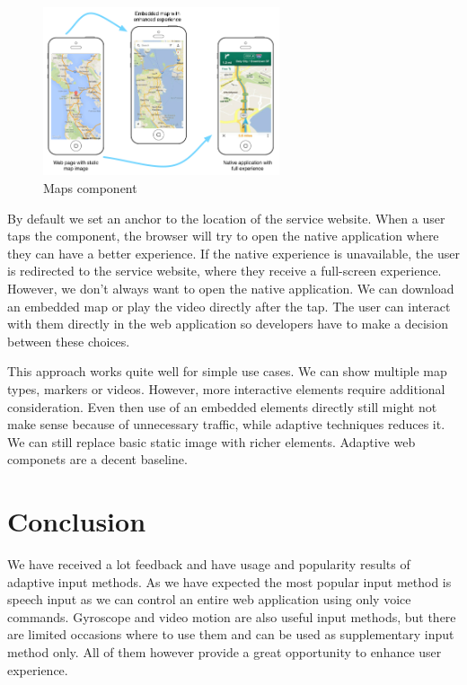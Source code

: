 \documentclass{iitsrc}
\begin{document}
\begin{figure}[ht]
    \begin{center}
        \includegraphics[width=0.62\textwidth]{../images/maps.png}
        \caption{Maps component}
        \label{fig:maps}
    \end{center}
\end{figure}

By default we set an anchor to the location of the service website. When a user taps the component, the browser will try to open the native application where they can have a better experience. If the native experience is unavailable, the user is redirected to the service website, where they receive a full-screen experience. However, we don't always want to open the native application. We can download an embedded map or play the video directly after the tap. The user can interact with them directly in the web application so developers have to make a decision between these choices.

This approach works quite well for simple use cases. We can show multiple map types, markers or videos. However, more interactive elements require additional consideration. Even then use of an embedded elements directly still might not make sense because of unnecessary traffic, while adaptive techniques reduces it. We can still replace basic static image with richer elements. Adaptive web componets are a decent baseline.




\section{Conclusion} %
\label{sec:conclusion}

We have received a lot feedback and have usage and popularity results of adaptive input methods. As we have expected the most popular input method is speech input as we can control an entire web application using only voice commands. Gyroscope and video motion are also useful input methods, but there are limited occasions where to use them and can be used as supplementary input method only. All of them however provide a great opportunity to enhance user experience.
\end{document}
